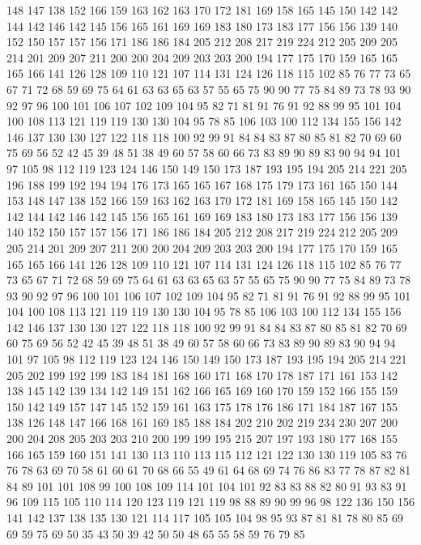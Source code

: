 148 147 138 152 166 159 163 162 163 170 172 181 169 158 165 145 150 142 142 144
142 146 142 145 156 165 161 169 169 183 180 173 183 177 156 156 139 140 152 150
157 157 156 171 186 186 184 205 212 208 217 219 224 212 205 209 205 214 201 209
207 211 200 200 204 209 203 203 200 194 177 175 170 159 165 165 165 166 141 126
128 109 110 121 107 114 131 124 126 118 115 102 85 76 77 73 65 67 71 72
68 59 69 75 64 61 63 63 65 63 57 55 65 75 90 90 77 75 84 89
73 78 93 90 92 97 96 100 101 106 107 102 109 104 95 82 71 81 91 76
91 92 88 99 95 101 104 100 108 113 121 119 119 130 130 104 95 78 85 106
103 100 112 134 155 156 142 146 137 130 130 127 122 118 118 100 92 99 91 84
84 83 87 80 85 81 82 70 69 60 75 69 56 52 42 45 39 48 51 38
49 60 57 58 60 66 73 83 89 90 89 83 90 94 94 101 97 105 98 112
119 123 124 146 150 149 150 173 187 193 195 194 205 214 221 205 196 188 199 192
194 194 176 173 165 165 167 168 175 179 173 161 165 150 144 153 148 147 138 152
166 159 163 162 163 170 172 181 169 158 165 145 150 142 142 144 142 146 142 145
156 165 161 169 169 183 180 173 183 177 156 156 139 140 152 150 157 157 156 171
186 186 184 205 212 208 217 219 224 212 205 209 205 214 201 209 207 211 200 200
204 209 203 203 200 194 177 175 170 159 165 165 165 166 141 126 128 109 110 121
107 114 131 124 126 118 115 102 85 76 77 73 65 67 71 72 68 59 69 75
64 61 63 63 65 63 57 55 65 75 90 90 77 75 84 89 73 78 93 90
92 97 96 100 101 106 107 102 109 104 95 82 71 81 91 76 91 92 88 99
95 101 104 100 108 113 121 119 119 130 130 104 95 78 85 106 103 100 112 134
155 156 142 146 137 130 130 127 122 118 118 100 92 99 91 84 84 83 87 80
85 81 82 70 69 60 75 69 56 52 42 45 39 48 51 38 49 60 57 58
60 66 73 83 89 90 89 83 90 94 94 101 97 105 98 112 119 123 124 146
150 149 150 173 187 193 195 194 205 214 221 205 202 199 192 199 183 184 181 168
160 171 168 170 178 187 171 161 153 142 138 145 142 139 134 142 149 151 162 166
165 169 160 170 159 152 166 155 159 150 142 149 157 147 145 152 159 161 163 175
178 176 186 171 184 187 167 155 138 126 148 147 166 168 161 169 185 188 184 202
210 202 219 234 230 207 200 200 204 208 205 203 203 210 200 199 199 195 215 207
197 193 180 177 168 155 166 165 159 160 151 141 130 113 110 113 115 112 121 122
130 130 119 105 83 76 76 78 63 69 70 58 61 60 61 70 68 66 55 49
61 64 68 69 74 76 86 83 77 78 87 82 81 84 89 101 101 108 99 100
108 109 114 101 104 101 92 83 83 88 82 80 91 93 83 91 96 109 115 105
110 114 120 123 119 121 119 98 88 89 90 99 96 98 122 136 150 156 141 142
137 138 135 130 121 114 117 105 105 104 98 95 93 87 81 81 78 80 85 69
69 59 75 69 50 35 43 50 39 42 50 50 48 65 55 58 59 76 79 85
